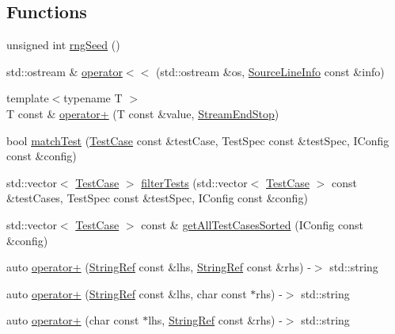 \subsection*{Functions}
\begin{DoxyCompactItemize}
\item 
unsigned int \mbox{\hyperlink{namespace_catch_acf5ea05e942d2d7fe79111e12754ed76}{rng\+Seed}} ()
\item 
std\+::ostream \& \mbox{\hyperlink{namespace_catch_a6ec18b5054d7fdfdde861c580b082995}{operator$<$$<$}} (std\+::ostream \&os, \mbox{\hyperlink{struct_catch_1_1_source_line_info}{Source\+Line\+Info}} const \&info)
\item 
{\footnotesize template$<$typename T $>$ }\\T const  \& \mbox{\hyperlink{namespace_catch_a5e95b3c47a7618db3649dc39b0bb9004}{operator+}} (T const \&value, \mbox{\hyperlink{struct_catch_1_1_stream_end_stop}{Stream\+End\+Stop}})
\item 
bool \mbox{\hyperlink{namespace_catch_aadef80fbc6bc84589777a462770cef49}{match\+Test}} (\mbox{\hyperlink{class_catch_1_1_test_case}{Test\+Case}} const \&test\+Case, Test\+Spec const \&test\+Spec, I\+Config const \&config)
\item 
std\+::vector$<$ \mbox{\hyperlink{class_catch_1_1_test_case}{Test\+Case}} $>$ \mbox{\hyperlink{namespace_catch_ab5da9aa67c42a3f626aea07d0b556829}{filter\+Tests}} (std\+::vector$<$ \mbox{\hyperlink{class_catch_1_1_test_case}{Test\+Case}} $>$ const \&test\+Cases, Test\+Spec const \&test\+Spec, I\+Config const \&config)
\item 
std\+::vector$<$ \mbox{\hyperlink{class_catch_1_1_test_case}{Test\+Case}} $>$ const  \& \mbox{\hyperlink{namespace_catch_a1c9b1a23bc947ea70ddaabf067276cf2}{get\+All\+Test\+Cases\+Sorted}} (I\+Config const \&config)
\item 
auto \mbox{\hyperlink{namespace_catch_a3a766cb0b8c792c9151baaaf1e8003eb}{operator+}} (\mbox{\hyperlink{class_catch_1_1_string_ref}{String\+Ref}} const \&lhs, \mbox{\hyperlink{class_catch_1_1_string_ref}{String\+Ref}} const \&rhs) -\/$>$ std\+::string
\item 
auto \mbox{\hyperlink{namespace_catch_ab7bdb68d0e4329df79e293f9207b55e9}{operator+}} (\mbox{\hyperlink{class_catch_1_1_string_ref}{String\+Ref}} const \&lhs, char const $\ast$rhs) -\/$>$ std\+::string
\item 
auto \mbox{\hyperlink{namespace_catch_a764a678121fa11c590a53618baa47680}{operator+}} (char const $\ast$lhs, \mbox{\hyperlink{class_catch_1_1_string_ref}{String\+Ref}} const \&rhs) -\/$>$ std\+::string

\end{DoxyCompactItemize}
